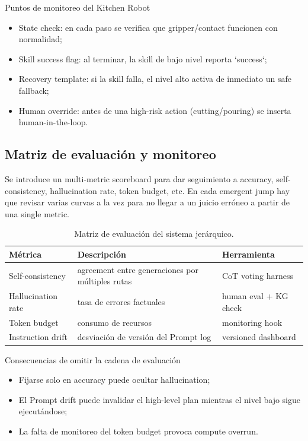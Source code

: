 \documentclass[a4paper]{article}
\begin{document}
\begin{knowledgebox}{Puntos de monitoreo del Kitchen Robot}
\begin{itemize}
    \item State check: en cada paso se verifica que gripper/contact funcionen con normalidad;
    \item Skill success flag: al terminar, la skill de bajo nivel reporta `success`;
    \item Recovery template: si la skill falla, el nivel alto activa de inmediato un safe fallback;
    \item Human override: antes de una high-risk action (cutting/pouring) se inserta human-in-the-loop.
\end{itemize}
\end{knowledgebox}

\subsection{Matriz de evaluación y monitoreo}

Se introduce un multi-metric scoreboard para dar seguimiento a accuracy, self-consistency, hallucination rate, token budget, etc. En cada emergent jump hay que revisar varias curvas a la vez para no llegar a un juicio erróneo a partir de una single metric.

\begin{table}[H]
\centering
\begin{tabular}{p{3.5cm}p{5cm}p{3cm}}
\toprule
Métrica & Descripción & Herramienta \\
\midrule
Self-consistency & agreement entre generaciones por múltiples rutas & CoT voting harness \\
Hallucination rate & tasa de errores factuales & human eval + KG check \\
Token budget & consumo de recursos & monitoring hook \\
Instruction drift & desviación de versión del Prompt log & versioned dashboard \\
\bottomrule
\end{tabular}
\caption{Matriz de evaluación del sistema jerárquico.}
\end{table}

\begin{warningbox}{Consecuencias de omitir la cadena de evaluación}
\begin{itemize}
    \item Fijarse solo en accuracy puede ocultar hallucination;
    \item El Prompt drift puede invalidar el high-level plan mientras el nivel bajo sigue ejecutándose;
    \item La falta de monitoreo del token budget provoca compute overrun.
\end{itemize}
\end{warningbox}
\end{document}
